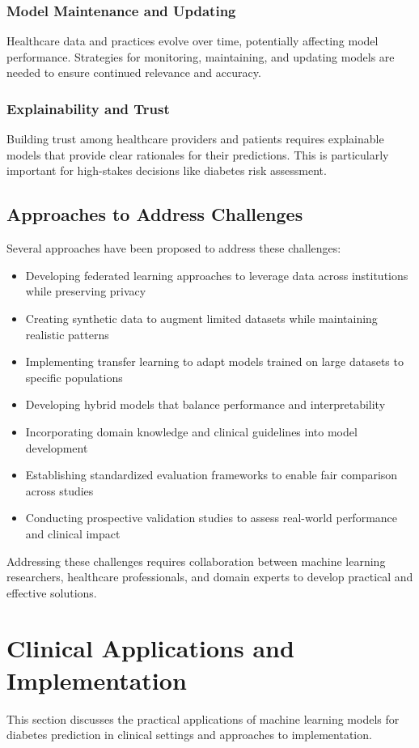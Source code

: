 \documentclass[journal]{IEEEtran}
\begin{document}
\subsubsection{Model Maintenance and Updating}
Healthcare data and practices evolve over time, potentially affecting model performance. Strategies for monitoring, maintaining, and updating models are needed to ensure continued relevance and accuracy.

\subsubsection{Explainability and Trust}
Building trust among healthcare providers and patients requires explainable models that provide clear rationales for their predictions. This is particularly important for high-stakes decisions like diabetes risk assessment.

\subsection{Approaches to Address Challenges}
Several approaches have been proposed to address these challenges:

\begin{itemize}
    \item Developing federated learning approaches to leverage data across institutions while preserving privacy
    \item Creating synthetic data to augment limited datasets while maintaining realistic patterns
    \item Implementing transfer learning to adapt models trained on large datasets to specific populations
    \item Developing hybrid models that balance performance and interpretability
    \item Incorporating domain knowledge and clinical guidelines into model development
    \item Establishing standardized evaluation frameworks to enable fair comparison across studies
    \item Conducting prospective validation studies to assess real-world performance and clinical impact
\end{itemize}

Addressing these challenges requires collaboration between machine learning researchers, healthcare professionals, and domain experts to develop practical and effective solutions.

\section{Clinical Applications and Implementation}
This section discusses the practical applications of machine learning models for diabetes prediction in clinical settings and approaches to implementation.
\end{document}

